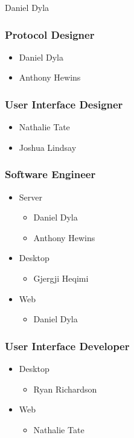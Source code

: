 \documentclass[11pt]{article}
\begin{document}
Daniel Dyla

\subsubsection{Protocol Designer}
\label{sec-5-1-2}

\begin{itemize}
\item Daniel Dyla
\item Anthony Hewins
\end{itemize}

\subsubsection{User Interface Designer}
\label{sec-5-1-3}

\begin{itemize}
\item Nathalie Tate
\item Joshua Lindsay
\end{itemize}

\subsubsection{Software Engineer}
\label{sec-5-1-4}

\begin{itemize}
\item Server
\begin{itemize}
\item Daniel Dyla
\item Anthony Hewins
\end{itemize}
\item Desktop
\begin{itemize}
\item Gjergji Heqimi
\end{itemize}
\item Web
\begin{itemize}
\item Daniel Dyla
\end{itemize}
\end{itemize}

\subsubsection{User Interface Developer}
\label{sec-5-1-5}

\begin{itemize}
\item Desktop
\begin{itemize}
\item Ryan Richardson
\end{itemize}
\item Web
\begin{itemize}
\item Nathalie Tate
\end{itemize}
\end{itemize}
\end{document}

